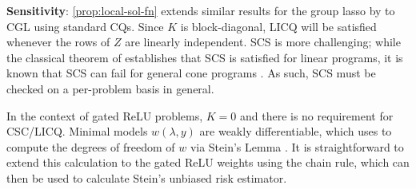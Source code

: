 \textbf{Sensitivity}:
\cref{prop:local-sol-fn} extends similar results for the group lasso by
\citet{vaiter2012dof} to CGL using standard
CQs.
Since \( K \) is block-diagonal,
LICQ will be satisfied whenever the rows of \( Z \) are linearly independent.
SCS is more challenging; while the classical theorem of
\citet{goldman20164} establishes that SCS is satisfied for linear programs,
it is known that SCS can fail for general cone programs \citep{tunccel2012strong}.
As such, SCS must be checked on a per-problem basis in general.

In the context of gated ReLU problems, \( K = 0 \) and there is no requirement
for CSC/LICQ.
Minimal models \( w(\lambda, y) \) are weakly differentiable, which
\citet{vaiter2012dof} uses to compute the degrees of freedom of
\( w \) via Stein's Lemma \citep{stein1981estimation}.
It is straightforward to extend this calculation to the gated ReLU weights
using the chain rule, which can then be used to calculate
Stein's unbiased risk estimator.




